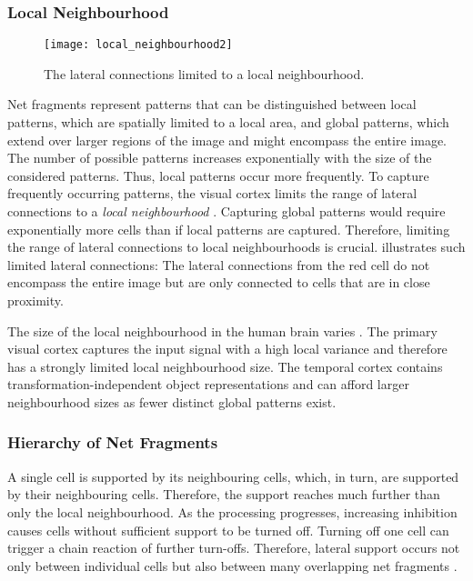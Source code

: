 \subsubsection{Local Neighbourhood}
\begin{figure}[h]
    \centering
    \texttt{[image: local\_neighbourhood2]}
    \caption[Lateral connections limited to a local neighbourhood]{The lateral connections limited to a local neighbourhood.}
\end{figure}
Net fragments represent patterns that can be distinguished between local patterns, which are spatially limited to a local area, and global patterns, which extend over larger regions of the image and might encompass the entire image.
The number of possible patterns increases exponentially with the size of the considered patterns. Thus, local patterns occur more frequently.
To capture frequently occurring patterns, the visual cortex limits the range of lateral connections to a \emph{local neighbourhood} .
Capturing global patterns would require exponentially more cells than if local patterns are captured. Therefore, limiting the range of lateral connections to local neighbourhoods is crucial.
 illustrates such limited lateral connections: The lateral connections from the red cell do not encompass the entire image but are only connected to cells that are in close proximity.

The size of the local neighbourhood in the human brain varies .
The primary visual cortex captures the input signal with a high local variance and therefore has a strongly limited local neighbourhood size. The temporal cortex contains transformation-independent object representations and can afford larger neighbourhood sizes as fewer distinct global patterns exist.

\subsubsection{Hierarchy of Net Fragments}
A single cell is supported by its neighbouring cells, which, in turn, are supported by their neighbouring cells. Therefore, the support reaches much further than only the local neighbourhood.
As the processing progresses, increasing inhibition causes cells without sufficient support to be turned off. Turning off one cell can trigger a chain reaction of further turn-offs. Therefore, lateral support occurs not only between individual cells but also between many overlapping net fragments .

